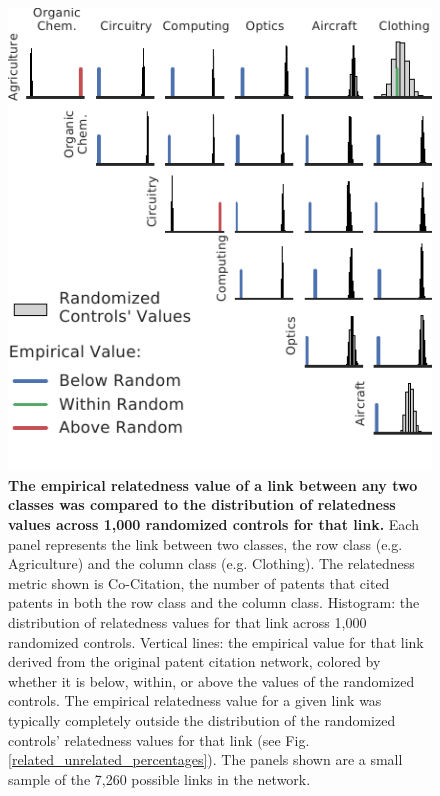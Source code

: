 \documentclass[pre,reprint,groupedaddress,superscriptaddress]{revtex4-1}
\begin{document}
\begin{figure}[]
\begin{center}
\includegraphics[width=\columnwidth]{figs/Rewiring_Histogram.pdf} 
\end{center}
\caption{\textbf{The empirical relatedness value of a link between any two classes was compared to the distribution of relatedness values across 1,000 randomized controls for that link.} Each panel represents the link between two classes, the row class (e.g. Agriculture) and the column class (e.g. Clothing). The relatedness metric shown is Co-Citation, the number of patents that cited patents in both the row class and the column class. Histogram: the distribution of relatedness values for that link across 1,000 randomized controls. Vertical lines: the empirical value for that link derived from the original patent citation network, colored by whether it is below, within, or above the values of the randomized controls. The empirical relatedness value for a given link was typically completely outside the distribution of the randomized controls' relatedness values for that link (see Fig. \ref{related_unrelated_percentages}). The panels shown are a small sample of the 7,260 possible links in the network.}\label{rewiring_histogram}
\end{figure}
\end{document}
